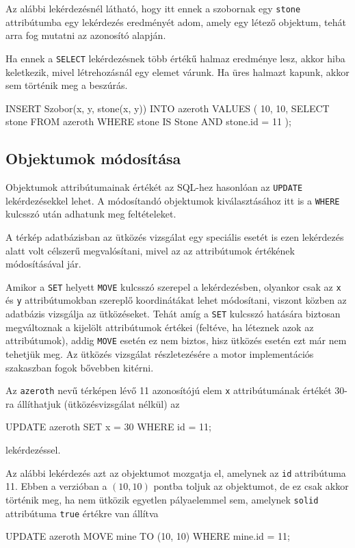 Az alábbi lekérdezésnél látható, hogy itt ennek a szobornak egy \texttt{stone} attribútumba egy lekérdezés eredményét adom, amely egy létező objektum, tehát arra fog mutatni az azonosító alapján.

Ha ennek a \texttt{SELECT} lekérdezésnek több értékű halmaz eredménye lesz, akkor hiba keletkezik, mivel létrehozásnál egy elemet várunk. Ha üres halmazt kapunk, akkor sem történik meg a beszúrás.
\begin{sql}
INSERT Szobor(x, y, stone(x, y)) INTO azeroth VALUES (
    10, 10,
    { SELECT stone FROM azeroth WHERE stone IS Stone AND stone.id = 11 }
);
\end{sql}

\subsection{Objektumok módosítása}

Objektumok attribútumainak értékét az SQL-hez hasonlóan az \texttt{UPDATE} lekérdezésekkel lehet. A módosítandó objektumok kiválasztásához itt is a \texttt{WHERE} kulcsszó után adhatunk meg feltételeket.

A térkép adatbázisban az ütközés vizsgálat egy speciális esetét is ezen lekérdezés alatt volt célszerű megvalósítani, mivel az az attribútumok értékének módosításával jár.

Amikor a \texttt{SET} helyett \texttt{MOVE} kulcsszó szerepel a lekérdezésben, olyankor csak az \texttt{x} és \texttt{y} attribútumokban szereplő koordinátákat lehet módosítani, viszont közben az adatbázis vizsgálja az ütközéseket. Tehát amíg a \texttt{SET} kulcsszó hatására biztosan megváltoznak a kijelölt attribútumok értékei (feltéve, ha léteznek azok az attribútumok), addig \texttt{MOVE} esetén ez nem biztos, hisz ütközés esetén ezt már nem tehetjük meg. Az ütközés vizsgálat részletezésére a motor implementációs szakaszban fogok bővebben kitérni.

Az \texttt{azeroth} nevű térképen lévő 11 azonosítójú elem \texttt{x} attribútumának értékét 30-ra állíthatjuk (ütközésvizsgálat nélkül) az
\begin{sql}
UPDATE azeroth SET x = 30 WHERE id = 11;
\end{sql}
lekérdezéssel.

Az alábbi lekérdezés azt az objektumot mozgatja el, amelynek az \texttt{id} attribútuma 11. Ebben a verzióban a $(10, 10)$ pontba toljuk az objektumot, de ez csak akkor történik meg, ha nem ütközik egyetlen pályaelemmel sem, amelynek \texttt{solid} attribútuma \texttt{true} értékre van állítva
\begin{sql}
UPDATE azeroth MOVE mine TO (10, 10) WHERE mine.id = 11;
\end{sql}

